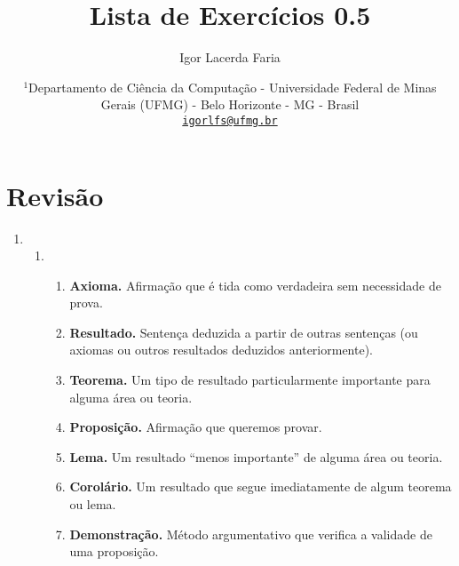 \documentclass{article}
\author{Igor Lacerda Faria}
\begin{document}
\title{\textbf{Lista de Exercícios 0.5}}
\date{%
    \( ^1 \)Departamento de Ciência da Computação - Universidade Federal de Minas Gerais (UFMG) - Belo Horizonte - MG - Brasil \\ [3ex]
    \href{mailto:igorlfs@ufmg.br}{\nolinkurl{igorlfs@ufmg.br}}
}
\maketitle
\section*{Revisão}
\begin{enumerate}

    \item

        \begin{enumerate}

            \item 

                \begin{enumerate}

                    \item \textbf{Axioma.} Afirmação que é tida como verdadeira sem necessidade de prova. 

                    \item \textbf{Resultado.} Sentença deduzida a partir de outras sentenças (ou axiomas ou outros resultados deduzidos anteriormente).

                    \item \textbf{Teorema.} Um tipo de resultado particularmente importante para alguma área ou teoria.

                    \item \textbf{Proposição.} Afirmação que queremos provar.

                    \item \textbf{Lema.} Um resultado ``menos importante'' de alguma área ou teoria.

                    \item \textbf{Corolário.} Um resultado que segue imediatamente de algum teorema ou lema.

                    \item \textbf{Demonstração.} Método argumentativo que verifica a validade de uma proposição.

                \end{enumerate}


\end{enumerate}
\end{enumerate}
\end{document}
